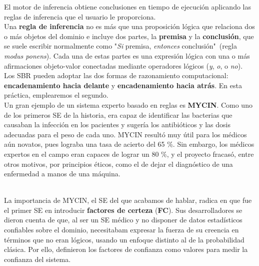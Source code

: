 \documentclass[a4paper,11pt, includehead]{article}
\begin{document}
El motor de inferencia obtiene conclusiones en tiempo de ejecución aplicando las reglas de inferencia que el usuario le proporciona.\\

Una \textbf{regla de inferencia} no es más que una proposición lógica que relaciona dos o más objetos del dominio e incluye dos partes, la \textbf{premisa} y la \textbf{conclusión}, que se suele escribir normalmente como "\textit{Si} premisa, \textit{entonces} conclusión"\ (regla \textit{modus ponens}). Cada una de estas partes es una expresión lógica con una o más afirmaciones objeto-valor conectadas mediante operadores lógicos (\textit{y}, \textit{o}, o \textit{no}).\cite{durkin1994}\\

Los SBR pueden adoptar las dos formas de razonamiento computacional: \textbf{encadenamiento hacia delante} y \textbf{encadenamiento hacia atrás}. En esta práctica, emplearemos el segundo.\\

Un gran ejemplo de un sistema experto basado en reglas es \textbf{MYCIN}. Como uno de los primeros SE de la historia, era capaz de identificar las bacterias que causaban la infección en los pacientes y sugería los antibióticos y las dosis adecuadas para el peso de cada uno. MYCIN resultó muy útil para los médicos aún novatos, pues lograba una tasa de acierto del 65 \%. Sin embargo, los médicos expertos en el campo eran capaces de lograr un 80 \%, y el proyecto fracasó, entre otros motivos, por principios éticos, como el de dejar el diagnóstico de una enfermedad a manos de una máquina.\cite{shortliffe1984}\\

\vspace{2ex}

\\

La importancia de MYCIN, el SE del que acabamos de hablar, radica en que fue el primer SE en introducir \textbf{factores de certeza} (\textbf{FC}). Sus desarrolladores se dieron cuenta de que, al ser un SE médico y no disponer de datos estadísticos confiables sobre el dominio, necesitabam expresar la fuerza de su creencia en términos que no eran lógicos, usando un enfoque distinto al de la probabilidad clásica.\cite{negnevitsky2005} Por ello, definieron los factores de confianza como valores para medir la confianza del sistema.\\
\end{document}
